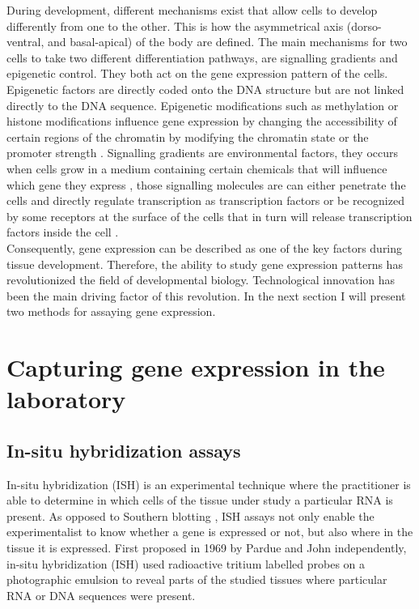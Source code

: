 	During development, different mechanisms exist that allow cells to develop differently from one to the other. This is how the asymmetrical axis (dorso-ventral, and basal-apical) of the body are defined. The main mechanisms for two cells to take two different differentiation pathways, are signalling gradients and epigenetic control. They both act on the gene expression pattern of the cells. Epigenetic factors are directly coded onto the DNA structure but are not linked directly to the DNA sequence. Epigenetic modifications such as methylation or histone modifications influence gene expression by changing the accessibility of certain regions of the chromatin by modifying the chromatin state or the promoter strength \cite{jaenisch03}. Signalling gradients are environmental factors, they occurs when cells grow in a medium containing certain chemicals that will influence which gene they express  \cite{chang02}, those signalling molecules are can either penetrate the cells and directly regulate transcription as transcription factors \cite{durston89} or be recognized by some receptors at the surface of the cells that in turn will release transcription factors inside the cell \cite{wang92}. \\
	
	Consequently, gene expression can be described as one of the key factors during tissue development. Therefore, the ability to study gene expression patterns has revolutionized the field of developmental biology. Technological innovation has been the main driving factor of this revolution. In the next section I will present two methods for assaying gene expression.


\section{Capturing gene expression in the laboratory}\label{sec:gene_expression_lab}
     \subsection{In-situ hybridization assays}
     In-situ hybridization (ISH) is an experimental technique where the practitioner is able to determine in which cells of the tissue under study a particular RNA is present. As opposed to Southern blotting \cite{southern75}, ISH assays not only enable the experimentalist to know whether a gene is expressed or not, but also where in the tissue it is expressed. First proposed in 1969 by Pardue \cite{pardue69} and John \cite{john69} independently, in-situ hybridization (ISH) used radioactive tritium labelled probes on a photographic emulsion to reveal parts of the studied tissues where particular RNA or DNA sequences were present.\\
     
